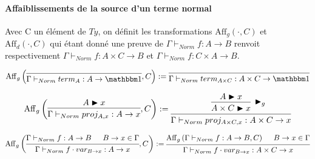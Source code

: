 \documentclass[12pt']{article}
\begin{document}
\paragraph{Affaiblissements de la source d'un terme normal} Avec C un élément de $Ty$, on définit les transformations $\mathrm{Aff}_g(\cdot, C)$ et $\mathrm{Aff}_d(\cdot, C)$ qui étant donné une preuve de $\Gamma \vdash_{Norm} f : A \rightarrow B$ renvoit respectivement $\Gamma \vdash_{Norm} f : A \times C \rightarrow B$ et $\Gamma \vdash_{Norm} f : C \times A \rightarrow B$.

\begin{equation}
	\mathrm{Aff}_g \left(
	\begin{prooftree}
		\infer0[]{\Gamma \vdash_{Norm} term_A : A \rightarrow \mathbbm 1}
	\end{prooftree}
	, C
	\right)
	:=
	\begin{prooftree}
		\infer0[]{\Gamma \vdash_{Norm} term_{A \times C} : A \times C \rightarrow \mathbbm 1}
	\end{prooftree}
\end{equation}

\begin{equation}
	\mathrm{Aff}_g \left(
	\begin{prooftree}
		\hypo[]{A \blacktriangleright x}
		\infer1[]{\Gamma \vdash_{Norm} proj_{A,x} : A \rightarrow x}
	\end{prooftree} 
	, C
	\right)
	:=
	\begin{prooftree}
		\hypo[]{A \blacktriangleright x}
		\infer1[$\blacktriangleright_g$]{A \times C \blacktriangleright x}
		\infer1[]{\Gamma \vdash_{Norm} proj_{A \times C,x} : A \times C \rightarrow x}
	\end{prooftree}
\end{equation}

\begin{equation}
	\mathrm{Aff}_g \left(
	\begin{prooftree}
		\hypo[]{\Gamma \vdash_{Norm} f : A \rightarrow B}
		\hypo[]{B \rightarrow x \in \Gamma}
		\infer2[]{\Gamma \vdash_{Norm} f \cdot var_{B \rightarrow x} : A \rightarrow x}
	\end{prooftree}
	, C
	\right)
	:=
	\begin{prooftree}
		\hypo[]{\mathrm{Aff}_g \left(\Gamma \vdash_{Norm} f : A \rightarrow B , C\right)}
		\hypo[]{B \rightarrow x \in \Gamma}
		\infer2[]{\Gamma \vdash_{Norm} f \cdot var_{B \rightarrow x} : A \times C \rightarrow x}
	\end{prooftree}
\end{equation}
\end{document}
